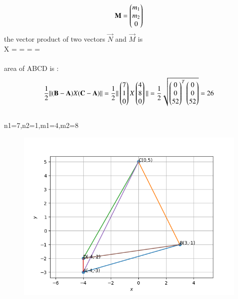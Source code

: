 \documentclass[journal,12pt,onecolumn]{IEEEtran}
\begin{document}
    \begin{align}
    \mathbf{M}=\begin{pmatrix}m_1\\m_2\\0\end{pmatrix}
\end{align}
the vector product of two vectors $\vec{N}$ and $\vec{M}$ is 
\\
X =
=
=
=
\\
\\
area of ABCD is :
\begin{align*}
    \dfrac{1}{2}||(\mathbf{B}-  \mathbf{A})X(\mathbf{C} -  \mathbf{A})||=\dfrac{1}{2}||\begin{pmatrix}7\\1\\0\end{pmatrix}X\begin{pmatrix}4\\8\\0\end{pmatrix}||= \dfrac{1}{2}\sqrt{\begin{pmatrix}0\\0\\52\end{pmatrix}^T\begin{pmatrix}0\\0\\52\end{pmatrix}}=26
    \end{align*}
    \\
    n1=7,n2=1,m1=4,m2=8
        \begin{figure}[H]
    \centering
    \includegraphics[width = 0.7\columnwidth]{figs/img.png}
    \caption*{}
    \label{figs}
\end{figure}
\end{document}
